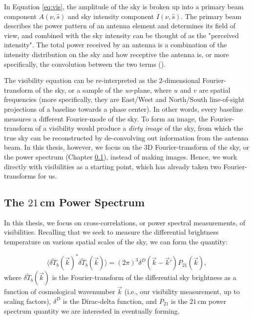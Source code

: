 In Equation \eqref{eq:vis}, the amplitude of the sky is broken up into a primary beam component $A(\nu,\hat{s})$ and sky intensity component $I(\nu,\hat{s})$. The primary beam describes the power pattern of an antenna element and determines its field of view, and combined with the sky intensity can be thought of as the "perceived intensity". The total power received by an antenna is a combination of the intensity distribution on the sky and how receptive the antenna is, or more specifically, the convolution between the two terms (\citealt{thompson_et_al2001}).

The visibility equation can be re-interpreted as the 2-dimensional Fourier-transform of the sky, or a sample of the \textit{uv}-plane, where $u$ and $v$ are spatial frequencies (more specifically, they are East/West and North/South line-of-sight projections of a baseline towards a phase center). In other words, every baseline measures a different Fourier-mode of the sky. To form an image, the Fourier-transform of a visibility would produce a \textit{dirty image} of the sky, from which the true sky can be reconstructed by de-convolving out information from the antenna beam. In this thesis, however, we focus on the 3D Fourier-transform of the sky, or the power spectrum (Chapter \ref{sec:PSoverview}), instead of making images. Hence, we work directly with visibilities as a starting point, which has already taken two Fourier-transforms for us. 

\subsection{The $21$\,cm Power Spectrum}
\label{sec:PSoverview}

In this thesis, we focus on cross-correlations, or power spectral measurements, of visibilities. Recalling that we seek to measure the differential brightness temperature on various spatial scales of the sky, we can form the quantity:

\begin{equation}
\label{eq:PSdef}
\langle \delta \tilde{T}_{b}(\vec{k})^{\ast} \delta \tilde{T}_{b}(\vec{k})\rangle = (2\pi)^{3} \delta^{D}(\vec{k}-\vec{k}')P_{21}(\vec{k}) ,
\end{equation}
where $\delta \tilde{T}_{b}(\vec{k})$ is the Fourier-transform of the differential sky brightness as a function of cosmological wavenumber $\vec{k}$ (i.e., our visibility measurement, up to scaling factors), $\delta^{D}$ is the Dirac-delta function, and $P_{21}$ is the $21$\,cm power spectrum quantity we are interested in eventually forming.

